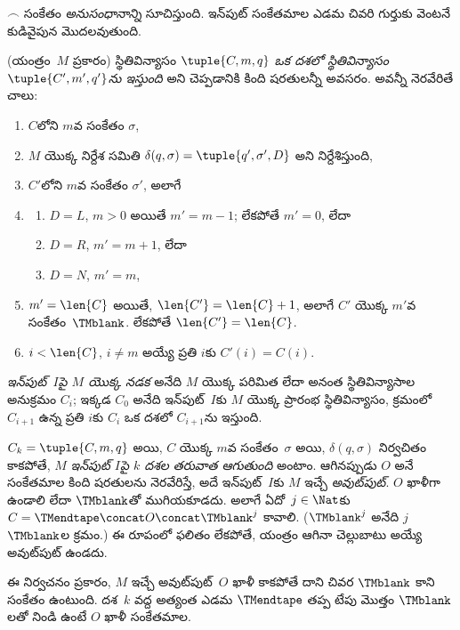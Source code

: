 \documentclass[../../../include/open-logic-section]{subfiles}
\begin{document}
\begin{explain}
$\frown$ సంకేతం \emph{అనుసంధానాన్ని} సూచిస్తుంది. ఇన్‌పుట్ సంకేతమాల ఎడమ
చివరి గుర్తుకు వెంటనే కుడివైపున మొదలవుతుంది.
\end{explain}

\begin{defn}
(యంత్రం~$M$ ప్రకారం) స్థితివిన్యాసం $\tuple{C, m, q}$
\emph{ఒక దశలో స్థితివిన్యాసం $\tuple{C', m', q'}$ను ఇస్తుంది} అని
చెప్పడానికి కింది షరతులన్నీ అవసరం. అవన్నీ నెరవేరితే చాలు:
\begin{enumerate}
\item $C$లోని $m$వ సంకేతం $\sigma$,
\item $M$ యొక్క నిర్దేశ సమితి $\delta(q, \sigma) =
  \tuple{q', \sigma', D}$ అని నిర్దేశిస్తుంది,
\item $C'$లోని $m$వ సంకేతం $\sigma'$, అలాగే
\item
\begin{enumerate}
\item $D = L$, $m>0$ అయితే $m' = m - 1$; లేకపోతే $m'=0$, లేదా
\item $D = R$, $m' = m + 1$, లేదా
\item $D = N$, $m' = m$,
\end{enumerate}
\item $m' = \len{C}$ అయితే, $\len{C'} = \len{C} + 1$, అలాగే $C'$ యొక్క
  $m'$వ సంకేతం~$\TMblank$. లేకపోతే $\len{C'}=\len{C}$.
\item $i < \len{C}$, $i \neq m$ అయ్యే ప్రతి $i$కు $C'(i) = C(i)$.
\end{enumerate}
\end{defn}

\begin{defn}
\emph{ఇన్‌పుట్~$I$పై $M$ యొక్క నడక} అనేది $M$ యొక్క పరిమిత లేదా అనంత
స్థితివిన్యాసాల అనుక్రమం $C_i$; ఇక్కడ $C_0$ అనేది ఇన్‌పుట్~$I$కు $M$ యొక్క
ప్రారంభ స్థితివిన్యాసం, క్రమంలో $C_{i+1}$ ఉన్న ప్రతి $i$కు $C_i$ ఒక దశలో
$C_{i+1}$ను ఇస్తుంది.

$C_k = \tuple{C, m, q}$ అయి, $C$ యొక్క $m$వ సంకేతం~$\sigma$ అయి,
$\delta(q, \sigma)$ నిర్వచితం కాకపోతే, $M$ \emph{ఇన్‌పుట్ $I$పై $k$
దశల తరువాత ఆగుతుంది} అంటాం. ఆగినప్పుడు $O$ అనే సంకేతమాల కింది
షరతులను నెరవేరిస్తే, అదే ఇన్‌పుట్~$I$కు $M$ ఇచ్చే \emph{అవుట్‌పుట్}.
$O$ ఖాళీగా ఉండాలి లేదా $\TMblank$తో ముగియకూడదు. అలాగే
ఏదో~$j \in \Nat$కు $C = \TMendtape \concat O \concat \TMblank^j$ కావాలి.
($\TMblank^j$ అనేది $j$ $\TMblank$ల క్రమం.) ఈ రూపంలో ఫలితం లేకపోతే,
యంత్రం ఆగినా చెల్లుబాటు అయ్యే అవుట్‌పుట్ ఉండదు.
\end{defn}

\begin{explain}
ఈ నిర్వచనం ప్రకారం, $M$ ఇచ్చే అవుట్‌పుట్~$O$ ఖాళీ కాకపోతే దాని చివర
$\TMblank$ కాని సంకేతం ఉంటుంది. దశ~$k$ వద్ద అత్యంత ఎడమ $\TMendtape$
తప్ప టేపు మొత్తం $\TMblank$లతో నిండి ఉంటే $O$ ఖాళీ సంకేతమాల.
\end{explain}
\end{document}
